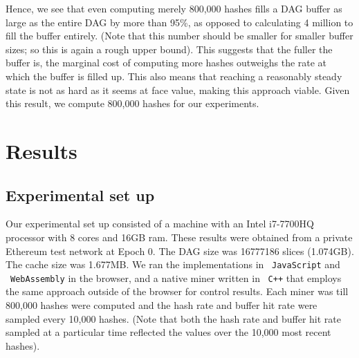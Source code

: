 \documentclass[runningheads]{llncs}
\begin{document}
Hence, we see that even computing merely 800,000 hashes fills a DAG buffer as large as the entire DAG by more than 95\%, as opposed to calculating 4 million to fill the buffer entirely. (Note that this number should be smaller for smaller buffer sizes; so this is again a rough upper bound). This suggests that the fuller the buffer is, the marginal cost of computing more hashes outweighs the rate at which the buffer is filled up. This also means that reaching a reasonably steady state is not as hard as it seems at face value, making this approach viable. Given this result, we compute 800,000 hashes for our experiments.

\section{Results}
\subsection{Experimental set up}
Our experimental set up consisted of a machine with an Intel i7-7700HQ processor with 8 cores and 16GB ram. These results were obtained from a private Ethereum test network at Epoch 0. The DAG size was 16777186 slices (1.074GB). The cache size was 1.677MB. We ran the implementations in ~\verb|JavaScript| and ~\verb|WebAssembly| in the browser, and a native miner written in ~\verb|C++| that employs the same approach outside of the browser for control results. Each miner was till 800,000 hashes were computed and the hash rate and buffer hit rate were sampled every 10,000 hashes. (Note that both the hash rate and buffer hit rate sampled at a particular time reflected the values over the 10,000 most recent hashes).


\end{document}
